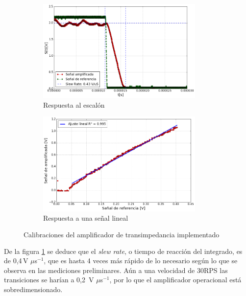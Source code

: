 \begin{figure}[H]
    \begin{subfigure}[b]{0.5\textwidth}
        \centering
        \includegraphics[width=0.9\textwidth]{fig/circuito/amp/transicion_cuadrada}
        \caption{Respuesta al escalón}
        \label{fig:circuito/amp/transicion_escalon}
    \end{subfigure}
    \begin{subfigure}[b]{0.5\textwidth}
        \centering
        \includegraphics[width=0.9\textwidth]{fig/circuito/amp/rango_lineal}
        \caption{Respuesta a una señal lineal}
        \label{fig:circuito/amp/rango_lineal}
    \end{subfigure}
    \caption{Calibraciones del amplificador de transimpedancia implementado}
\end{figure}

De la figura \ref{fig:circuito/amp/transicion_escalon} se deduce que el \emph{slew rate}, o tiempo de reacción del integrado, es de 0,4$\,$V $\mu$s$^{-1}$, que es hasta 4 veces más rápido de lo necesario según lo que se observa en las mediciones preliminares. Aún a una velocidad de 30RPS las transiciones se harían a 0,2 $\,$V $\mu$s$^{-1}$, por lo que el amplificador operacional está sobredimensionado.

